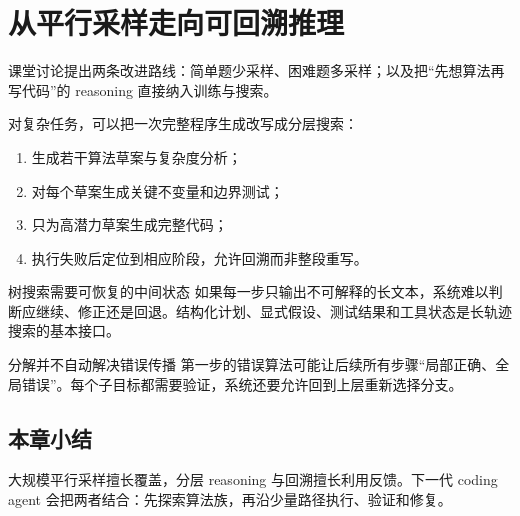 \section{从平行采样走向可回溯推理}

课堂讨论提出两条改进路线：简单题少采样、困难题多采样；以及把“先想算法再写代码”的 reasoning 直接纳入训练与搜索。

对复杂任务，可以把一次完整程序生成改写成分层搜索：

\begin{enumerate}
    \item 生成若干算法草案与复杂度分析；
    \item 对每个草案生成关键不变量和边界测试；
    \item 只为高潜力草案生成完整代码；
    \item 执行失败后定位到相应阶段，允许回溯而非整段重写。
\end{enumerate}

\begin{importantbox}{树搜索需要可恢复的中间状态}
如果每一步只输出不可解释的长文本，系统难以判断应继续、修正还是回退。结构化计划、显式假设、测试结果和工具状态是长轨迹搜索的基本接口。
\end{importantbox}

\begin{warningbox}{分解并不自动解决错误传播}
第一步的错误算法可能让后续所有步骤“局部正确、全局错误”。每个子目标都需要验证，系统还要允许回到上层重新选择分支。
\end{warningbox}

\subsection{本章小结}

大规模平行采样擅长覆盖，分层 reasoning 与回溯擅长利用反馈。下一代 coding agent 会把两者结合：先探索算法族，再沿少量路径执行、验证和修复。

